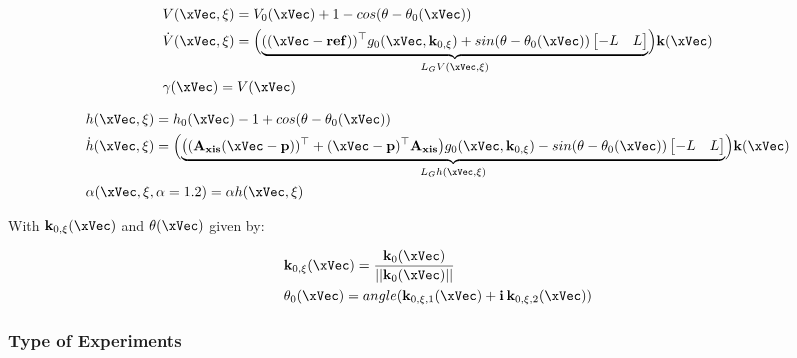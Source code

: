 \begin{subequations}
   \begin{align}
    &V(\xVec, \xi) = V_0(\xVec) + 1 - cos(\theta - \theta_0(\xVec)) \label{eq:V_unicycle} \\
    &\dot{V}(\xVec, \xi) = \Bigl(\underbrace{((\xVec-\mathbf{ref}))^{\top}g_0(\xVec, \mathbf{k}_{0,\xi}) + sin(\theta -\theta_0(\xVec))\begin{bmatrix} -L & L \end{bmatrix}}_{L_GV(\xVec, \xi)} \Bigr) \mathbf{k}(\xVec)  \label{eq:dot_V_unicycle} \\
    &\gamma(\xVec)  = V(\xVec) \label{eq:CLF_gamma_unicycle}
\end{align}
\label{eq:CLF_unicycle}
\end{subequations}

\begin{subequations}
   \begin{align}
    &h(\xVec, \xi) = h_0(\xVec) - 1 + cos(\theta - \theta_0(\xVec)) \label{eq:h_unicycle} \\
    &\dot{h}(\xVec, \xi) = \Bigl(\underbrace{\bigl((\mathbf{A_{xis}}(\xVec-\mathbf{p}))^{\top} + (\xVec-\mathbf{p})^{\top}\mathbf{A_{xis}}\bigr)g_0(\xVec, \mathbf{k}_{0,\xi}) - sin(\theta -\theta_0(\xVec))\begin{bmatrix} -L & L \end{bmatrix}}_{L_Gh(\xVec, \xi)} \Bigr) \mathbf{k}(\xVec)  \label{eq:dot_h_unicycle} \\
    &\alpha(\xVec, \xi, \alpha = 1.2)  = \alpha h(\xVec, \xi) \label{eq:CBF_alpha_unicycle}
\end{align}
\label{eq:CBF_unicycle}
\end{subequations}


With \(\mathbf{k}_{0,\xi}(\xVec)\) and \(\theta(\xVec)\) given by:

\begin{align}
    &\mathbf{k}_{0,\xi}(\xVec) = \frac{\mathbf{k}_0(\xVec) }{|| \mathbf{k}_0(\xVec) ||}      \\
    &\theta_0(\xVec) = angle(\mathbf{k}_{0,\xi,1}(\xVec) + \mathbf{i} \hspace{0.2em} \mathbf{k}_{0,\xi,2}(\xVec))
\end{align}


\subsubsection{Type of Experiments}
\label{subsubsec:unicyle_type_of_experiments}


